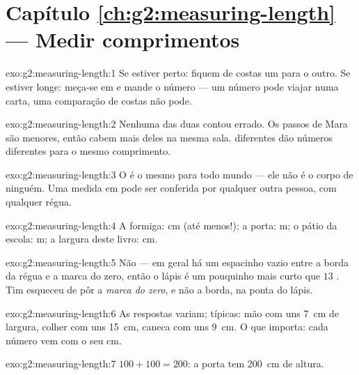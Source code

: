 \section*{Capítulo \ref{ch:g2:measuring-length} --- Medir comprimentos}

\begin{solution}{exo:g2:measuring-length:1}
Se estiver perto: fiquem de costas um para o outro. Se estiver longe:
meça-se em  e mande o número --- um número pode viajar
numa carta, uma comparação de costas não pode.
\end{solution}

\begin{solution}{exo:g2:measuring-length:2}
Nenhuma das duas contou errado. Os passos de Mara são menores, então
cabem mais deles na mesma sala.  diferentes dão números
diferentes para o mesmo comprimento.
\end{solution}

\begin{solution}{exo:g2:measuring-length:3}
O  é o mesmo para todo mundo --- ele não é o corpo de
ninguém. Uma medida em  pode ser conferida por qualquer
outra pessoa, com qualquer régua.
\end{solution}

\begin{solution}{exo:g2:measuring-length:4}
A formiga: \unit{cm} (até menos!); a porta: \unit{m}; o pátio da
escola: \unit{m}; a largura deste livro: \unit{cm}.
\end{solution}

\begin{solution}{exo:g2:measuring-length:5}
Não --- em geral há um espacinho vazio entre a borda da régua e a
marca do zero, então o lápis é um pouquinho mais curto que $13$
. Tim esqueceu de pôr a \emph{marca do zero}, e não a
borda, na ponta do lápis.
\end{solution}

\begin{solution}{exo:g2:measuring-length:6}
As respostas variam; típicas: mão com uns \qty{7}{cm} de largura,
colher com uns \qty{15}{cm}, caneca com uns \qty{9}{cm}. O que
importa: cada número vem com o seu \unit{cm}.
\end{solution}

\begin{solution}{exo:g2:measuring-length:7}
$100 + 100 = 200$: a porta tem \qty{200}{cm} de altura.
\end{solution}

